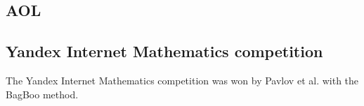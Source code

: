 \subsection{AOL}

\subsection{Yandex Internet Mathematics competition}
The Yandex Internet Mathematics competition was won by Pavlov et al. \cite{Pavlov2010} with the BagBoo method.
